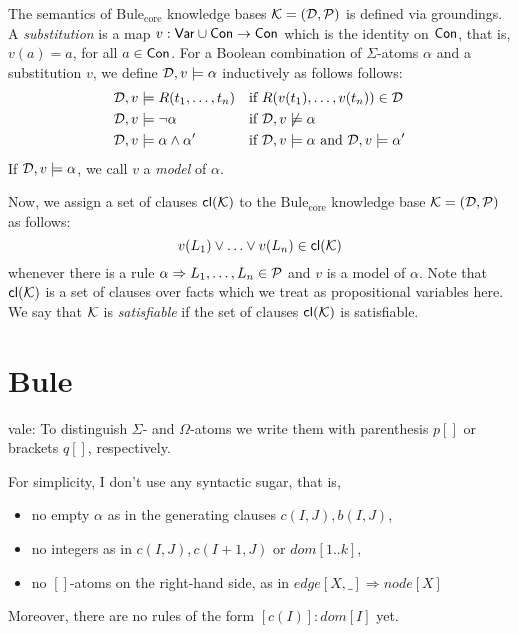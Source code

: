 \documentclass{article}
\newcommand{\vale}[1]{\textcolor[rgb]{0.00,0.00,0.54296875}{vale: #1} }
\newcommand{\bcore}{\ensuremath{\text{Bule}_\text{core}}\xspace}
\begin{document}
The semantics of \bcore knowledge bases $\mathcal{K}=(\mathcal{D},\mathcal{P})$ is defined via
groundings. A \emph{substitution} is a map
$v:\mathsf{Var}\cup\mathsf{Con}\to\mathsf{Con}$ which is the identity on
$\mathsf{Con}$, that is, $v(a)=a$, for all $a\in\mathsf{Con}$. For a Boolean combination of $\Sigma$-atoms $\alpha$ and a
substitution $v$, we define $\mathcal{D},v\models \alpha$ inductively as
follows follows: 
%
\begin{align*}
  \mathcal{D},v & \models R(t_1,\ldots,t_n) && \text{if
  $R(v(t_1),\ldots,v(t_n))\in \mathcal{D}$} \\
  \mathcal{D}, v& \models \neg \alpha && \text{if $\mathcal{D},v\not\models \alpha$}
  \\
  \mathcal{D}, v& \models \alpha \wedge \alpha' && \text{if $\mathcal{D},v\models
  \alpha$ and $\mathcal{D},v\models\alpha'$}
\end{align*}
%
If $\mathcal{D},v\models\alpha$, we call $v$ a \emph{model} of $\alpha$.

Now, we assign a set of clauses $\mathsf{cl}(\mathcal{K})$ to the \bcore knowledge
base $\mathcal{K}=(\mathcal{D},\mathcal{P})$ as follows:
%
\[v(L_1)\vee\ldots\vee v(L_n)\in \mathsf{cl}(\mathcal{K})\]
%
whenever there is a rule $\alpha \Rightarrow L_1,\ldots,L_n\in\mathcal{P}$ and $v$ is a
model of $\alpha$. Note that $\mathsf{cl}(\mathcal{K})$ is a set of clauses over
facts which we treat as propositional variables here.  We say that
$\mathcal{K}$ is \emph{satisfiable} if the set of clauses $\mathsf{cl}(\mathcal{K})$ is
satisfiable. 

\section{Bule}

\vale{To distinguish $\Sigma$- and $\Omega$-atoms we
write them with parenthesis $p[]$ or brackets $q[]$, respectively. }


{\color{red}For simplicity, I don't use any syntactic sugar, that is,
%
\begin{itemize}

  \item no empty $\alpha$ as in the generating clauses
    $c(I,J),b(I,J)$,

  \item no integers as in $c(I,J),c(I+1,J)$ or $dom[1..k]$,

  \item no $[]$-atoms on the right-hand side, as in $edge[X,\_ ]
    \Rightarrow node[X]$

\end{itemize}
Moreover, there are no rules of the form $[c(I)]:dom[I]$ yet. 
}
\end{document}
